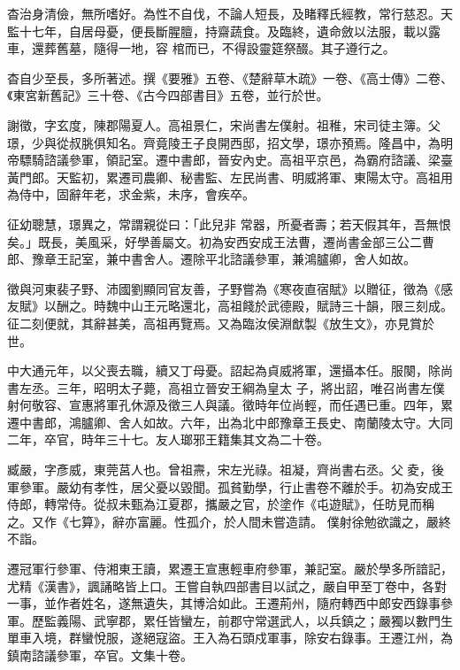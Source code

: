 \begin{pinyinscope}
 杳治身清儉，無所嗜好。為性不自伐，不論人短長，及睹釋氏經教，常行慈忍。天監十七年，自居母憂，便長斷腥膻，持齋蔬食。及臨終，遺命斂以法服，載以露車，還葬舊墓，隨得一地，容
 棺而已，不得設靈筵祭醊。其子遵行之。



 杳自少至長，多所著述。撰《要雅》五卷、《楚辭草木疏》一卷、《高士傳》二卷、《東宮新舊記》三十卷、《古今四部書目》五卷，並行於世。



 謝徵，字玄度，陳郡陽夏人。高祖景仁，宋尚書左僕射。祖稚，宋司徒主簿。父璟，少與從叔朓俱知名。齊竟陵王子良開西邸，招文學，璟亦預焉。隆昌中，為明帝驃騎諮議參軍，領記室。遷中書郎，晉安內史。高祖平京邑，為霸府諮議、梁臺黃門郎。天監初，累遷司農卿、秘書監、左民尚書、明威將軍、東陽太守。高祖用為侍中，固辭年老，求金紫，未序，會疾卒。



 征幼聰慧，璟異之，常謂親從曰：「此兒非
 常器，所憂者壽；若天假其年，吾無恨矣。」既長，美風采，好學善屬文。初為安西安成王法曹，遷尚書金部三公二曹郎、豫章王記室，兼中書舍人。遷除平北諮議參軍，兼鴻臚卿，舍人如故。



 徵與河東裴子野、沛國劉顯同官友善，子野嘗為《寒夜直宿賦》以贈征，徵為《感友賦》以酬之。時魏中山王元略還北，高祖餞於武德殿，賦詩三十韻，限三刻成。征二刻便就，其辭甚美，高祖再覽焉。又為臨汝侯淵猷製《放生文》，亦見賞於世。



 中大通元年，以父喪去職，續又丁母憂。詔起為貞威將軍，還攝本任。服闋，除尚書左丞。三年，昭明太子薨，高祖立晉安王綱為皇太
 子，將出詔，唯召尚書左僕射何敬容、宣惠將軍孔休源及徵三人與議。徵時年位尚輕，而任遇已重。四年，累遷中書郎，鴻臚卿、舍人如故。六年，出為北中郎豫章王長史、南蘭陵太守。大同二年，卒官，時年三十七。友人瑯邪王籍集其文為二十卷。



 臧嚴，字彥威，東莞莒人也。曾祖燾，宋左光祿。祖凝，齊尚書右丞。父夌，後軍參軍。嚴幼有孝性，居父憂以毀聞。孤貧勤學，行止書卷不離於手。初為安成王侍郎，轉常侍。從叔未甄為江夏郡，攜嚴之官，於塗作《屯遊賦》，任昉見而稱之。又作《七算》，辭亦富麗。性孤介，於人間未嘗造請。
 僕射徐勉欲識之，嚴終不詣。



 遷冠軍行參軍、侍湘東王讀，累遷王宣惠輕車府參軍，兼記室。嚴於學多所諳記，尤精《漢書》，諷誦略皆上口。王嘗自執四部書目以試之，嚴自甲至丁卷中，各對一事，並作者姓名，遂無遺失，其博洽如此。王遷荊州，隨府轉西中郎安西錄事參軍。歷監義陽、武寧郡，累任皆蠻左，前郡守常選武人，以兵鎮之；嚴獨以數門生單車入境，群蠻悅服，遂絕寇盜。王入為石頭戍軍事，除安右錄事。王遷江州，為鎮南諮議參軍，卒官。文集十卷。




\end{pinyinscope}
